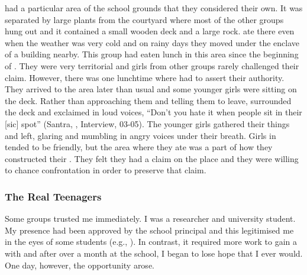  had a particular area of the school grounds that they considered their own. It was separated by large plants from the courtyard where most of the other groups hung out and it contained a small wooden deck and a large rock.  ate there even when the weather was very cold and on rainy days they moved under the enclave of a building nearby. This group had eaten lunch in this area since the beginning of . They were very territorial and girls from other groups rarely challenged their claim. However, there was one lunchtime where  had to assert their authority. They arrived to the area later than usual and some younger girls were sitting on the deck. Rather than approaching them and telling them to leave,  surrounded the deck and exclaimed in loud voices, ``Don't you hate it when people sit in their [sic] spot'' (Santra, , Interview, 03-05). The younger girls gathered their things and left, glaring and mumbling in angry voices under their breath. Girls in  tended to be friendly, but the area where they ate was a part of how they constructed their . They felt they had a claim on the place and they were willing to chance confrontation in order to preserve that claim.


\subsubsection{The Real Teenagers}

Some groups trusted me immediately. I was a researcher and university student. My presence had been approved by the school principal and this legitimised me in the eyes of some students (e.g., ). In contrast, it required more work to gain a  with  and after over a month at the school, I began to lose hope that I ever would. One day, however, the opportunity arose.

